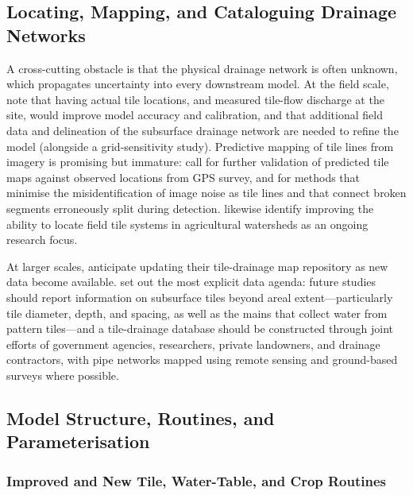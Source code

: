 \documentclass[11pt]{article}
\begin{document}
\subsection{Locating, Mapping, and Cataloguing Drainage Networks}

A cross-cutting obstacle is that the physical drainage network is often unknown, which propagates uncertainty into every downstream model. At the field scale, \textcite{Amado2018} note that having actual tile locations, and measured tile-flow discharge at the site, would improve model accuracy and calibration, and that additional field data and delineation of the subsurface drainage network are needed to refine the model (alongside a grid-sensitivity study). Predictive mapping of tile lines from imagery is promising but immature: \textcite{Naz2009} call for further validation of predicted tile maps against observed locations from GPS survey, and for methods that minimise the misidentification of image noise as tile lines and that connect broken segments erroneously split during detection. \textcite{Schilling2019} likewise identify improving the ability to locate field tile systems in agricultural watersheds as an ongoing research focus.

At larger scales, \textcite{Valayamkunnath2020} anticipate updating their tile-drainage map repository as new data become available. \textcite{Zhou2025} set out the most explicit data agenda: future studies should report information on subsurface tiles beyond areal extent---particularly tile diameter, depth, and spacing, as well as the mains that collect water from pattern tiles---and a tile-drainage database should be constructed through joint efforts of government agencies, researchers, private landowners, and drainage contractors, with pipe networks mapped using remote sensing and ground-based surveys where possible.

\subsection{Model Structure, Routines, and Parameterisation}

\subsubsection{Improved and New Tile, Water-Table, and Crop Routines}
\end{document}
